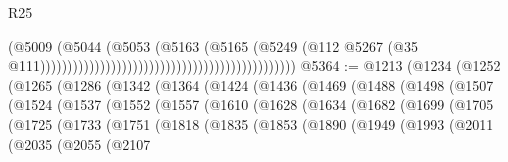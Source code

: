 \begin{lexlean}{R25}
\begin{coremodule}
                                                                                  (@5009
                                                                                    (@5044
                                                                                      (@5053
                                                                                        (@5163
                                                                                          (@5165
                                                                                            (@5249
                                                                                              (@112
                                                                                                @5267
                                                                                                (@35
                                                                                                  @111)))))))))))))))))))))))))))))))))))))))))))))))
@5364 := @1213
    (@1234
      (@1252
        (@1265
          (@1286
            (@1342
              (@1364
                (@1424
                  (@1436
                    (@1469
                      (@1488
                        (@1498
                          (@1507
                            (@1524
                              (@1537
                                (@1552
                                  (@1557
                                    (@1610
                                      (@1628
                                        (@1634
                                          (@1682
                                            (@1699
                                              (@1705
                                                (@1725
                                                  (@1733
                                                    (@1751
                                                      (@1818
                                                        (@1835
                                                          (@1853
                                                            (@1890
                                                              (@1949
                                                                (@1993
                                                                  (@2011
                                                                    (@2035
                                                                      (@2055
                                                                        (@2107

\end{coremodule}
\end{lexlean}
